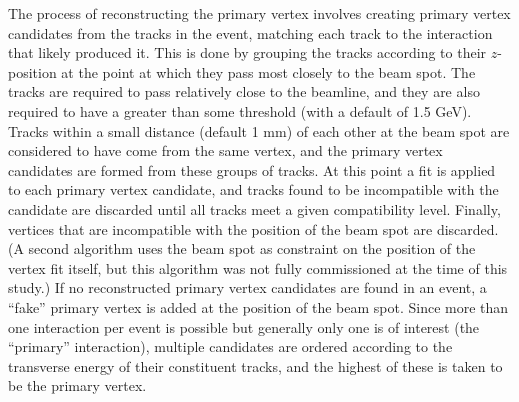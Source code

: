 The process of reconstructing the primary vertex 
\cite{CMS-NOTE-2006-026} 
\cite{CMS-NOTE-2006-029} 
involves creating primary vertex candidates
from the tracks in the event,
matching each track to the interaction
that likely produced it.
This is done by grouping the tracks according 
to their $z$-position at the point at which they pass 
most closely to the beam spot.  
The tracks are required to pass relatively close 
to the beamline, 
and they are also required to have a \pt greater 
than some threshold (with a default of 1.5 GeV).  
Tracks within a small distance (default 1 mm) of each other 
at the beam spot are considered to have come from 
the same vertex, 
and the primary vertex candidates are formed from these 
groups of tracks.  
At this point a fit is applied to each primary vertex candidate, 
and tracks found to be incompatible with the candidate are discarded 
until all tracks meet a given compatibility level.  
Finally, vertices that are incompatible with the position 
of the beam spot are discarded.  
(A second algorithm uses the beam spot as constraint on the 
position of the vertex fit itself, 
but this algorithm was not fully commissioned at the time 
of this study.)  
If no reconstructed primary vertex candidates are found in 
an event, 
a ``fake'' primary vertex is added at the position 
of the beam spot.  
Since more than one interaction per event is possible 
but generally only one is of interest (the ``primary'' interaction), 
multiple candidates are ordered according to the transverse energy of 
their constituent tracks, 
and the highest of these is taken to be the primary vertex.  

\clearpage

